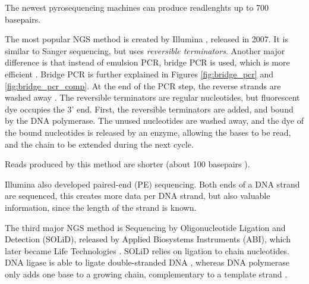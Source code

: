 \documentclass[../main/thesis.tex]{subfiles}
\begin{document}
The newest pyrosequencing machines can produce readlenghts up to 700 basepairs.



The most popular NGS method is created by Illumina \cite{most_popular_ngs}, released in 2007.
It is similar to Sanger sequencing, but uses \textit{reversible terminators}.
Another major difference is that instead of emulsion PCR, bridge PCR is used, which is more efficient \cite{ngs_sequencing_atdbio}.
Bridge PCR is further explained in Figures \ref{fig:bridge_pcr} and \ref{fig:bridge_pcr_comp}.
At the end of the PCR step, the reverse strands are washed away \cite{bridge_pcr_reverse}.
The reversible terminators are regular nucleotides, but fluorescent dye occupies the 3' end.
First, the reversible terminators are added, and bound by the DNA polymerase.
The unused nucleotides are washed away, and the dye of the bound nucleotides is released by an enzyme, allowing the bases to be read, and the chain to be extended during the next cycle.

Reads produced by this method are shorter (about 100 basepairs \cite{ngs_history}\cite{pyro_sequencing1}).


Illumina also developed paired-end (PE) sequencing.
Both ends of a DNA strand are sequenced, this creates more data per DNA strand, but also valuable information, since the length of the strand is known.



The third major NGS method is Sequencing by Oligonucleotide Ligation and Detection (SOLiD), released by Applied Biosystems Instruments (ABI), which later became Life Technologies \cite{history_sequencing}.
SOLiD relies on ligation to chain nucleotides.
DNA ligase is able to ligate double-stranded DNA \cite{ngs_sequencing_atdbio}, whereas DNA polymerase only adds one base to a growing chain, complementary to a template strand \cite{dna_replication}.
\end{document}
